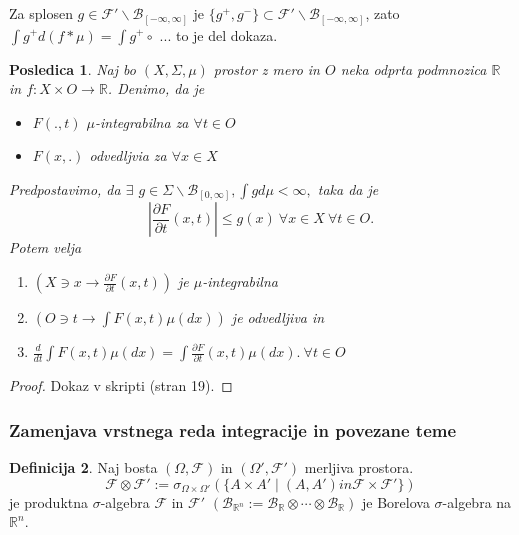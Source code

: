 \documentclass[a4paper,12pt]{article}
\theoremstyle{definition} %
\newtheorem{definicija}{Definicija}[section]
\theoremstyle{plain} %
\newtheorem{posledica}[definicija]{Posledica}
\newcommand{\R}{\mathbb{R}}
\newcommand{\F}{\mathcal{F}}
\begin{document}
            Za splosen $g \in \F'\backslash\mathcal{B}_{[-\infty, \infty]}$ je $\{g^+, g^-\} \subset \F'\backslash\mathcal{B}_{[-\infty, \infty]}$,
            zato $\int g^+d(f* \mu) = \int g^+ \circ $ ... to je del dokaza.

            \begin{posledica}
                Naj bo $(X, \Sigma, \mu)$ prostor z mero in $O$ neka odprta podmnozica $\R$ in $f:X \times O \rightarrow \R$. Denimo, da je 
                \begin{itemize}
                    \item $F(., t)$ $\mu$-integrabilna za $\forall t \in O$
                    \item $F(x, .)$ odvedljvia za $\forall x \in X$ 
                \end{itemize}
                Predpostavimo, da $\exists$ $g \in \Sigma\backslash\mathcal{B}_{[0, \infty]}, \int g d\mu < \infty,$ taka da je 
                $$
                    \left|\frac{\partial F}{\partial t}(x, t) \right| \leq g(x) \ \forall x \in X \ \forall t \in O.
                $$
                Potem velja 
                \begin{enumerate}
                    \item $(X \ni x \rightarrow \frac{\partial F}{\partial t}(x, t))$ je $\mu$-integrabilna
                    \item $(O \ni t \rightarrow \int F(x,t)\mu(dx))$ je odvedljiva in 
                    \item $\frac{d}{dt}\int F(x, t)\mu(dx) = \int \frac{\partial F}{\partial t}(x, t)\mu(dx). \ \forall t \in O$
                \end{enumerate}
            \end{posledica}

            \begin{proof}
                Dokaz v skripti (stran 19).
            \end{proof}

        \subsubsection{Zamenjava vrstnega reda integracije in povezane teme}
            
            \begin{definicija}
                Naj bosta $(\Omega, \F)$ in $(\Omega', \F')$ merljiva prostora. 
                $$
                    \F \otimes \F' := \sigma_{\Omega \times \Omega'}(\{A \times A' \mid (A, A') in \F \times \F'\})
                $$
                je produktna $\sigma$-algebra $\F$ in $\F'$ $(\mathcal{B}_{\R^n} := \mathcal{B}_{\R} \otimes \cdots \otimes \mathcal{B}_{\R})$ je Borelova
                $\sigma$-algebra na $\R^n$.
            \end{definicija}
\end{document}
